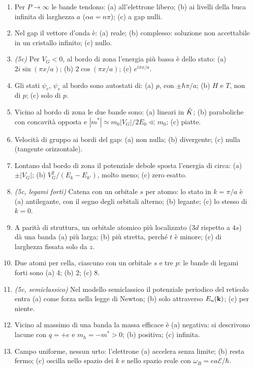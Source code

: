 \documentclass[11pt,a4paper]{article}
\begin{document}
\begin{enumerate}[label=\textbf{R\arabic*.}, leftmargin=2.3em, itemsep=2pt]
(a) si allargano; (b) non cambiano; (c) si restringono, $W\propto e^{-\beta c}$.
\item Per $P\to\infty$ le bande tendono:
(a) all'elettrone libero; (b) ai livelli della buca infinita di larghezza $a$ ($\alpha a=n\pi$); (c) a gap nulli.
\item Nel gap il vettore d'onda è:
(a) reale; (b) complesso: soluzione non accettabile in un cristallo infinito; (c) nullo.
\item \emph{(5c)} Per $V_G<0$, al bordo di zona l'energia più bassa è dello stato:
(a) $2i\sin(\pi x/a)$; (b) $2\cos(\pi x/a)$; (c) $e^{i\pi x/a}$.
\item Gli stati $\psi_c$, $\psi_s$ al bordo sono autostati di:
(a) $p$, con $\pm\hbar\pi/a$; (b) $H$ e $T$, non di $p$; (c) solo di $p$.
\item Vicino al bordo di zona le due bande sono:
(a) lineari in $\tilde K$; (b) paraboliche con concavità opposta e $|m^*|\simeq m_0|V_G|/2E_0\ll m_0$; (c) piatte.
\item Velocità di gruppo ai bordi del gap:
(a) non nulla; (b) divergente; (c) nulla (tangente orizzontale).
\item Lontano dal bordo di zona il potenziale debole sposta l'energia di circa:
(a) $\pm|V_G|$; (b) $V_G^2/(E_k-E_{k'})$, molto meno; (c) zero esatto.
\item \emph{(5c, legami forti)} Catena con un orbitale $s$ per atomo: lo stato in $k=\pi/a$ è
(a) antilegante, con il segno degli orbitali alterno; (b) legante; (c) lo stesso di $k=0$.
\item A parità di struttura, un orbitale atomico più localizzato ($3d$ rispetto a $4s$) dà una banda
(a) più larga; (b) più stretta, perché $t$ è minore; (c) di larghezza fissata solo da $z$.
\item Due atomi per cella, ciascuno con un orbitale $s$ e tre $p$: le bande di legami forti sono
(a) 4; (b) 2; (c) 8.
\item \emph{(5c, semiclassico)} Nel modello semiclassico il potenziale periodico del reticolo entra
(a) come forza nella legge di Newton; (b) solo attraverso $E_n(\mathbf k)$; (c) per niente.
\item Vicino al massimo di una banda la massa efficace è
(a) negativa: si descrivono lacune con $q=+e$ e $m_h=-m^*>0$; (b) positiva; (c) infinita.
\item Campo uniforme, nessun urto: l'elettrone
(a) accelera senza limite; (b) resta fermo; (c) oscilla nello spazio dei $k$ e nello spazio reale con $\omega_B=ea\mathcal E/\hbar$.
\end{enumerate}
\end{document}
